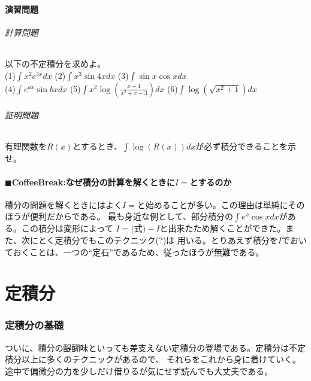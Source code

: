 \documentclass[a4j,dvipdfmx]{jsarticle}
\begin{document}
\subsection{演習問題}
\paragraph{計算問題}
以下の不定積分を求めよ。\\

(1)$\displaystyle \int x^2e^{3x}dx$
\hspace{20mm}
(2)$\displaystyle \int x^3\sin 4xdx$
\hspace{20mm}
(3)$\displaystyle \int \sin x\cos xdx$\\

(4)$\displaystyle \int e^{ax}\sin bxdx$
\hspace{15mm}
(5)$\displaystyle \int x^2\log\left(\frac{x+1}{x^2+x-3}\right)dx$
\hspace{0.5mm}
(6)$\displaystyle \int \log(\sqrt{x^2+1})dx$
\\
\paragraph{証明問題}
有理関数を$R(x)$とするとき、$\displaystyle \int \log(R(x))dx$が必ず積分できることを示せ。

\hrulefill
\subsection{$\blacksquare$CoffeeBreak:なぜ積分の計算を解くときに$I=$とするのか}
\begin{screen}
    積分の問題を解くときにはよく$I=$と始めることが多い。この理由は単純にそのほうが便利だからである。
    最も身近な例として、部分積分の$\displaystyle\int e^x\cos xdx$がある。この積分は変形によって
    $I=\text{(式)}-I$と出来たため解くことができた。また、次にとく定積分でもこのテクニック(?)は
    用いる。とりあえず積分を$I$でおいておくことは、一つの``定石''であるため、従ったほうが無難である。
\end{screen}
\newpage

\part{定積分}
\section{定積分の基礎}
ついに、積分の醍醐味といっても差支えない定積分の登場である。定積分は不定積分以上に多くのテクニックがあるので、
それらをこれから身に着けていく。途中で偏微分の力を少しだけ借りるが気にせず読んでも大丈夫である。
\end{document}
